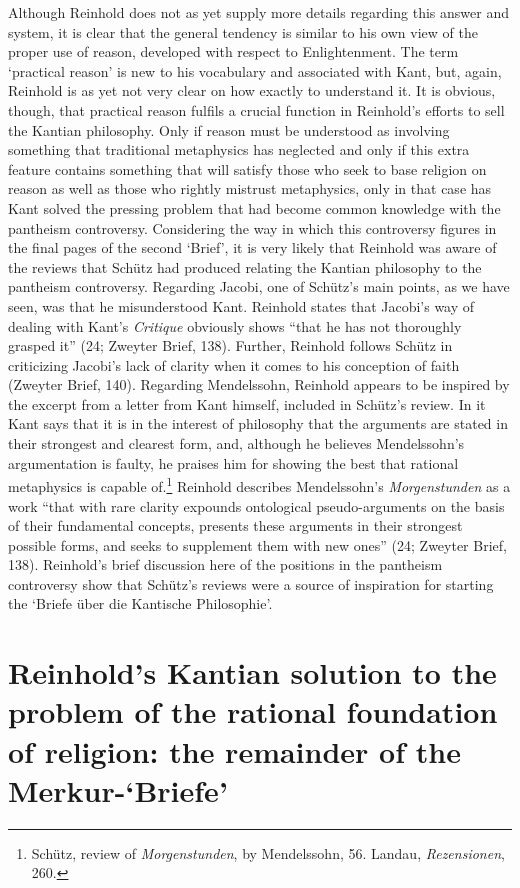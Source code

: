 Although Reinhold does not as yet supply more details regarding this answer and system, it is clear that the general tendency is similar to his own view of the proper use of reason, developed with respect to Enlightenment. The term `practical reason' is new to his vocabulary and associated with Kant, but, again, Reinhold is as yet not very clear on how exactly to understand it. It is obvious, though, that practical reason fulfils a crucial function in Reinhold's efforts to sell the Kantian philosophy. Only if reason must be understood as involving something that traditional metaphysics has neglected and only if this extra feature contains something that will satisfy those who seek to base religion on reason as well as those who rightly mistrust metaphysics, only in that case has Kant solved the pressing problem that had become common knowledge with the pantheism controversy. Considering the way in which this controversy figures in the final pages of the second `Brief', it is very likely that Reinhold was aware of the reviews that Sch\"{u}tz had produced relating the Kantian philosophy to the pantheism controversy. Regarding Jacobi, one of Sch\"{u}tz's main points, as we have seen, was that he misunderstood Kant. Reinhold states that Jacobi's way of dealing with Kant's \textit{Critique} obviously shows ``that he has not thoroughly grasped it'' (24; Zweyter Brief, 138). Further, Reinhold follows Sch\"{u}tz in criticizing Jacobi's lack of clarity when it comes to his conception of faith (Zweyter Brief, 140). Regarding Mendelssohn, Reinhold appears to be inspired by the excerpt from a letter from Kant himself, included in Sch\"{u}tz's review. In it Kant says that it is in the interest of philosophy that the arguments are stated in their strongest and clearest form, and, although he believes Mendelssohn's argumentation is faulty, he praises him for showing the best that rational metaphysics is capable of.\footnote{ Sch\"{u}tz, review of \textit{Morgenstunden}, by Mendelssohn, 56. Landau, \textit{Rezensionen}, 260.} Reinhold describes Mendelssohn's \textit{Morgenstunden }as a work ``that with rare clarity expounds ontological pseudo{-}arguments on the basis of their fundamental concepts, presents these arguments in their strongest possible forms, and seeks to supplement them with new ones'' (24; Zweyter Brief, 138). Reinhold's brief discussion here of the positions in the pantheism controversy show that Sch\"{u}tz's reviews were a source of inspiration for starting the `Briefe \"{u}ber die Kantische Philosophie'.


\section{Reinhold's Kantian solution to the problem of the rational foundation of religion: the remainder of the Merkur{-}`Briefe'}


